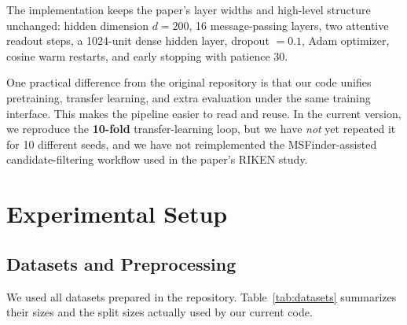 The implementation keeps the paper's layer widths and high-level structure unchanged: hidden dimension \(d=200\), 16 message-passing layers, two attentive readout steps, a 1024-unit dense hidden layer, dropout \(=0.1\), Adam optimizer, cosine warm restarts, and early stopping with patience 30.

One practical difference from the original repository is that our code unifies pretraining, transfer learning, and extra evaluation under the same training interface. This makes the pipeline easier to read and reuse. In the current version, we reproduce the \textbf{10-fold} transfer-learning loop, but we have \emph{not} yet repeated it for 10 different seeds, and we have not reimplemented the MSFinder-assisted candidate-filtering workflow used in the paper's RIKEN study.

\section{Experimental Setup}

\subsection{Datasets and Preprocessing}

We used all datasets prepared in the repository. Table~\ref{tab:datasets} summarizes their sizes and the split sizes actually used by our current code.

